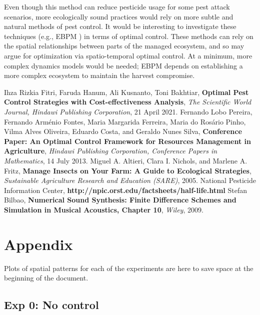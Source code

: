 \documentclass[11pt]{article}
\begin{document}
Even though this method can reduce pesticide usage for some pest attack scenarios, more ecologically sound practices would rely on more subtle and natural methods of pest control. It would be interesting to investigate these techniques (e.g., EBPM \cite{R3}) in terms of optimal control. These methods can rely on the spatial relationships between parts of the managed ecosystem, and so may argue for optimization via spatio-temporal optimal control. At a minimum, more complex dynamics models would be needed; EBPM depends on establishing a more complex ecosystem to maintain the harvest compromise. 


%
%

\begin{thebibliography}{1}
 Ihza Rizkia Fitri, Faruda Hanum, Ali Kusnanto, Toni Bakhtiar, \textbf{Optimal Pest Control Strategies with Cost-effectiveness Analysis}, \textit{The Scientific World Journal, Hindawi Publishing Corporation}, 21 April 2021.
 Fernando Lobo Pereira, Fernando Arménio Fontes, Maria Margarida Ferreira, 
Maria do Rosário Pinho, Vilma Alves Oliveira, Eduardo Costa, and Geraldo Nunes Silva, \textbf{Conference Paper: An Optimal Control Framework for Resources Management in Agriculture}, \textit{Hindawi Publishing Corporation, Conference Papers in Mathematics},  14 July 2013.
 Miguel A. Altieri, Clara I. Nichols, and Marlene A. Fritz, 
\textbf{Manage Insects on Your Farm: A Guide to Ecological Strategies},
\textit{Sustainable Agriculture Research and Education (SARE)}, 2005.
 National Pesticide Information Center, \textbf{http://npic.orst.edu/factsheets/half-life.html}
 Stefan Bilbao,
\textbf{Numerical Sound Synthesis: Finite Difference Schemes and Simulation in Musical Acoustics, Chapter 10},
\textit{Wiley}, 2009.
\end{thebibliography}


\section{Appendix}

Plots of spatial patterns for each of the experiments are here to save space at the beginning of the document.

\subsection{Exp 0: No control}
\end{document}
